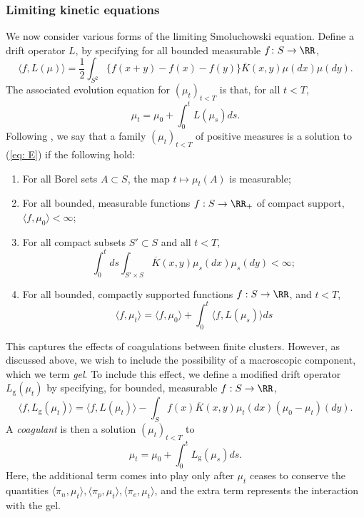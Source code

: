 \subsubsection{Limiting kinetic equations}
We now consider various forms of the limiting Smoluchowski equation.  Define a drift operator $L$, by specifying for all bounded measurable $f\colon S \rightarrow \RR$, 
 \begin{equation} \label{eq: drift wo gel}
    \langle f,L(\mu)\rangle=\frac{1}{2}\int_{S^2}\{f(x+y)-f(x)-f(y)\}\overline{K}(x,y)\mu(dx)\mu(dy).
\end{equation}
The associated evolution equation for $(\mu_t)_{t<T}$ is that, for all $t<T$,
\begin{equation}
    \tag{E-G}\label{eq: E} \mu_t =  \mu_0 +\int_0^t L(\mu_s) ds.
\end{equation} Following \cite{N00}, we say that a family $(\mu_t)_{t<T}$ of positive measures is a solution to (\ref{eq: E}) if the following hold: \begin{enumerate}[label=\roman{*}).] \item For all Borel sets $A\subset S$, the map $t\mapsto \mu_t(A)$ is measurable; \item For all bounded, measurable functions $f:S\rightarrow \RR_+$ of compact support, $\langle f, \mu_0\rangle<\infty$; \item For all compact subsets $S'\subset S$ and all $t<T$, \begin{equation} \int_0^t ds \int_{S'\times S}\overline{K}(x,y)\mu_s(dx)\mu_s(dy)<\infty; \end{equation}  \item For all bounded, compactly supported functions $f:S\rightarrow \RR$, and $t<T$, \begin{equation}
    \langle f, \mu_t \rangle =  \langle f,\mu_0\rangle +\int_0^t \langle f, L(\mu_s)\rangle ds
\end{equation} \end{enumerate} 
 This captures the effects of coagulations between finite clusters. However, as discussed above, we wish to include the possibility of a macroscopic component, which we term \emph{gel}. To include this effect, we define a modified drift operator $L_\mathrm{g}(\mu_t)$ by specifying, for bounded, measurable $f:S\rightarrow \RR$, \begin{equation} \langle f,L_\mathrm{g}(\mu_t)\rangle =\langle f, L(\mu_t)\rangle -\int_{S}f(x)\overline{K}(x,y)\mu_t(dx)(\mu_0-\mu_t)(dy). \end{equation} A \emph{coagulant} is then a solution $(\mu_t)_{t<T}$ to \begin{equation} \tag{E+G} \label{eq: E+G}
    \mu_t= \mu_0 + \int_0^t L_\mathrm{g}(\mu_s)ds.
\end{equation} Here, the additional term comes into play only after $\mu_t$ ceases to conserve the quantities $\langle \pi_n, \mu_t\rangle, \langle \pi_p, \mu_t\rangle ,\langle \pi_e, \mu_t\rangle$, and the extra term represents the interaction with the gel.

